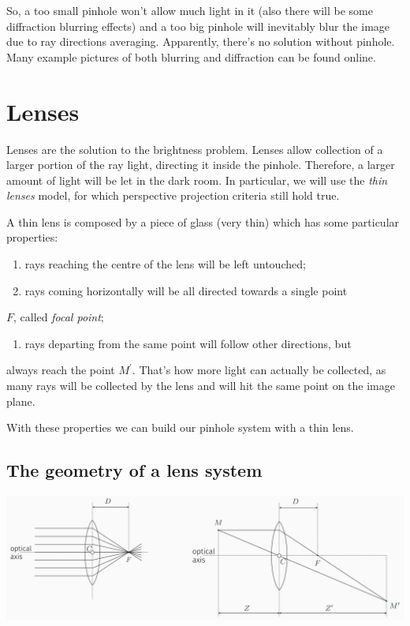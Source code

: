 \documentclass[10pt]{report}
\begin{document}
So, a too small pinhole won't allow much light in it (also there will be
some diffraction blurring effects) and a too big pinhole will inevitably
blur the image due to ray directions averaging. Apparently, there's no
solution without pinhole. Many example pictures of both blurring and
diffraction can be found online.

\section{Lenses}
\label{lenses}
Lenses are the solution to the brightness problem. Lenses allow
collection of a larger portion of the ray light, directing it inside the
pinhole. Therefore, a larger amount of light will be let in the dark
room. In particular, we will use the \emph{thin lenses} model, for which
perspective projection criteria still hold true.

A thin lens is composed by a piece of glass (very thin) which has some
particular properties:

\begin{enumerate}
\item rays reaching the centre of the lens will be left untouched;
\item rays coming horizontally will be all directed towards a single point
\end{enumerate}
\(F\), called \emph{focal point};
\begin{enumerate}
\item rays departing from the same point will follow other directions, but
\end{enumerate}
always reach the point \(M^\prime\). That's how more light can actually be collected, as many rays will be collected by the lens and will hit the same point on the image plane.

With these properties we can build our pinhole system with a thin lens.

\subsection{The geometry of a lens system}
\label{the-geometry-of-a-lens-system}
\begin{center}
\includegraphics[width=.9\linewidth]{./pics/visio/thin-lens.jpg}
\end{center}
\end{document}
